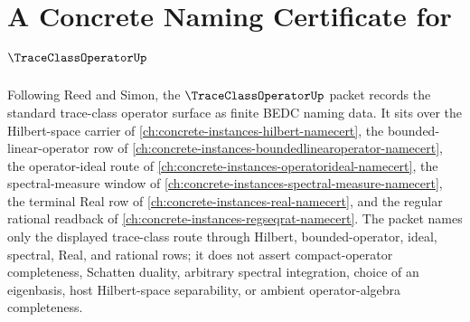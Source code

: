 \chapter{A Concrete Naming Certificate for $\TraceClassOperatorUp$}
\label{ch:concrete-instances-trace-class-operator-namecert}

Following Reed and Simon, the $\TraceClassOperatorUp$ packet records the standard trace-class operator surface as finite BEDC naming data. It sits over the Hilbert-space carrier of \autoref{ch:concrete-instances-hilbert-namecert}, the bounded-linear-operator row of \autoref{ch:concrete-instances-boundedlinearoperator-namecert}, the operator-ideal route of \autoref{ch:concrete-instances-operatorideal-namecert}, the spectral-measure window of \autoref{ch:concrete-instances-spectral-measure-namecert}, the terminal Real row of \autoref{ch:concrete-instances-real-namecert}, and the regular rational readback of \autoref{ch:concrete-instances-regseqrat-namecert}. The packet names only the displayed trace-class route through Hilbert, bounded-operator, ideal, spectral, Real, and rational rows; it does not assert compact-operator completeness, Schatten duality, arbitrary spectral integration, choice of an eigenbasis, host Hilbert-space separability, or ambient operator-algebra completeness.


